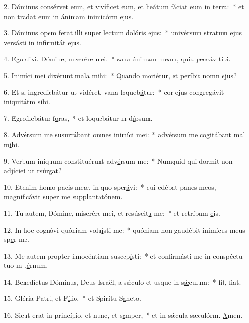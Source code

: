 2. Dóminus consérvet eum, et vivíficet eum, et beátum fáciat eum in t\uline{e}rra:~* et non tradat eum in ánimam inimicórm \uline{e}jus.\par 
3. Dóminus opem ferat illi super lectum dolóris \uline{e}jus:~* univérsum stratum ejus versásti in infirmitát \uline{e}jus.\par 
4. Ego dixi: Dómine, miserére m\uline{e}i:~* sana ánimam meam, quia peccáv t\uline{i}bi.\par 
5. Inimíci mei dixérunt mala m\uline{i}hi:~* Quando moriétur, et períbit nomn \uline{e}jus?\par 
6. Et si ingrediebátur ut vidéret, vana loqueb\uline{á}tur:~* cor ejus congregávit iniquitátm s\uline{i}bi.\par 
7. Egrediebátur f\uline{o}ras,~* et loquebátur in d\uline{í}psum.\par 
8. Advérsum me susurrábant omnes inimíci m\uline{e}i:~* advérsum me cogitábant mal m\uline{i}hi.\par 
9. Verbum iníquum constituérunt adv\uline{é}rsum me:~* Numquid qui dormit non adjíciet ut rs\uline{ú}rgat?\par 
10. Etenim homo pacis meæ, in quo sper\uline{á}vi:~* qui edébat panes meos, magnificávit super me supplantat\uline{ó}nem.\par 
11. Tu autem, Dómine, miserére mei, et resúscit\uline{a} me:~* et retríbum \uline{e}is.\par 
12. In hoc cognóvi quóniam volu\uline{í}sti me:~* quóniam non gaudébit inimícus meus sp\uline{e}r me.\par 
13. Me autem propter innocéntiam suscep\uline{í}sti:~* et confirmásti me in conspéctu tuo in t\uline{é}rnum.\par 
14. Benedíctus Dóminus, Deus Israël, a sǽculo et usque in s\uline{ǽ}culum:~* fit, f\uline{i}at.\par 
15. Glória Patri, et F\uline{í}lio,~* et Spirítu S\uline{a}ncto.\par 
16. Sicut erat in princípio, et nunc, et s\uline{e}mper,~* et in sǽcula sæculórm. \uline{A}men.\par 
